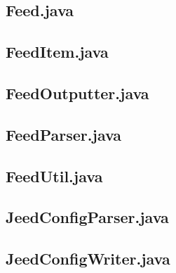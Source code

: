 \documentclass[titlepage, twoside, a4paper, 12pt]{article}
\begin{document}
\subsection{Feed.java}\label{Feed.java}
\begin{footnotesize}
  
\end{footnotesize}

\newpage
\subsection{FeedItem.java}\label{FeedItem.java}
\begin{footnotesize}
  
\end{footnotesize}

\newpage
\subsection{FeedOutputter.java}\label{FeedOutputter.java}
\begin{footnotesize}
  
\end{footnotesize}

\newpage
\subsection{FeedParser.java}\label{FeedParser.java}
\begin{footnotesize}
  
\end{footnotesize}

\newpage
\subsection{FeedUtil.java}\label{FeedUtil.java}
\begin{footnotesize}
  
\end{footnotesize}

\newpage
\subsection{JeedConfigParser.java}\label{JeedConfigParser.java}
\begin{footnotesize}
  
\end{footnotesize}

\newpage
\subsection{JeedConfigWriter.java}\label{JeedConfigWriter.java}
\begin{footnotesize}
  
\end{footnotesize}
\end{document}

